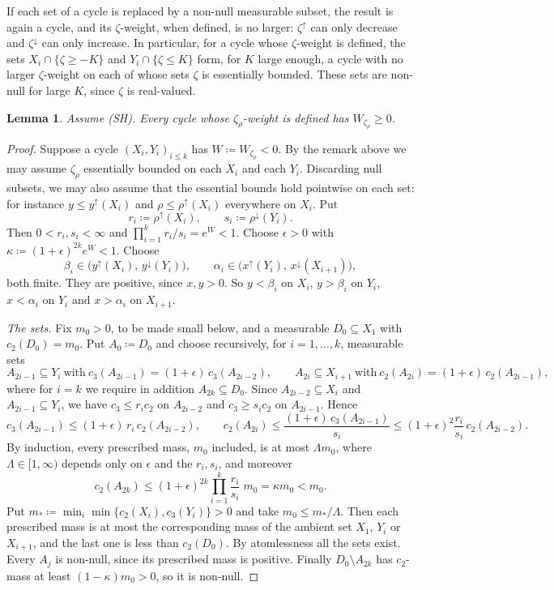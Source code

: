 \documentclass[11pt]{article}
\newtheorem{lemma}[theorem]{Lemma}
\theoremstyle{definition}\newtheorem{definition}[theorem]{Definition}
\theoremstyle{remark}\newtheorem{remark}[theorem]{Remark}
\begin{document}
If each set of a cycle is replaced by a non-null measurable subset, the
result is again a cycle, and its $\zeta$-weight, when defined, is no larger:
$\zeta^{\uparrow}$ can only decrease and $\zeta^{\downarrow}$ can only
increase. In particular, for a cycle whose $\zeta$-weight is defined, the
sets $X_i\cap\{\zeta\ge-K\}$ and $Y_i\cap\{\zeta\le K\}$ form, for $K$ large
enough, a cycle with no larger $\zeta$-weight on each of whose sets $\zeta$
is essentially bounded. These sets are non-null for large $K$, since $\zeta$
is real-valued.

\begin{lemma}\label{lem:sep-debt}
Assume (SH). Every cycle whose $\zeta_\rho$-weight is defined has
$W_{\zeta_\rho}\ge0$.
\end{lemma}

\begin{proof}
Suppose a cycle $(X_i,Y_i)_{i\le k}$ has $W\coloneqq W_{\zeta_\rho}<0$. By the
remark above we may assume $\zeta_\rho$ essentially bounded on each $X_i$
and each $Y_i$. Discarding null subsets, we may also assume that the
essential bounds hold pointwise on each set: for instance
$y\le y^{\uparrow}(X_i)$ and $\rho\le\rho^{\uparrow}(X_i)$ everywhere on
$X_i$. Put
\[
 r_i\coloneqq\rho^{\uparrow}(X_i),\qquad s_i\coloneqq\rho^{\downarrow}(Y_i).
\]
Then $0<r_i,s_i<\infty$ and $\prod_{i=1}^kr_i/s_i=e^{W}<1$. Choose
$\epsilon>0$ with $\kappa\coloneqq(1+\epsilon)^{2k}e^{W}<1$. Choose
\[
 \beta_i\in\bigl(y^{\uparrow}(X_i),\,y^{\downarrow}(Y_i)\bigr),\qquad
 \alpha_i\in\bigl(x^{\uparrow}(Y_i),\,x^{\downarrow}(X_{i+1})\bigr),
\]
both finite. They are positive, since $x,y>0$. So $y<\beta_i$ on $X_i$,
$y>\beta_i$ on $Y_i$, $x<\alpha_i$ on $Y_i$ and $x>\alpha_i$ on $X_{i+1}$.

\emph{The sets.} Fix $m_0>0$, to be made small below, and a measurable
$D_0\subseteq X_1$ with $c_2(D_0)=m_0$. Put $A_0\coloneqq D_0$ and choose
recursively, for $i=1,\dots,k$, measurable sets
\[
 A_{2i-1}\subseteq Y_i\ \text{with}\ c_3(A_{2i-1})=(1+\epsilon)\,c_3(A_{2i-2}),
 \qquad
 A_{2i}\subseteq X_{i+1}\ \text{with}\ c_2(A_{2i})=(1+\epsilon)\,c_2(A_{2i-1}),
\]
where for $i=k$ we require in addition $A_{2k}\subseteq D_0$. Since
$A_{2i-2}\subseteq X_i$ and $A_{2i-1}\subseteq Y_i$, we have
$c_3\le r_ic_2$ on $A_{2i-2}$ and $c_3\ge s_ic_2$ on $A_{2i-1}$. Hence
\[
 c_3(A_{2i-1})\le(1+\epsilon)\,r_i\,c_2(A_{2i-2}),\qquad
 c_2(A_{2i})\le\frac{(1+\epsilon)\,c_3(A_{2i-1})}{s_i}
 \le(1+\epsilon)^2\frac{r_i}{s_i}\,c_2(A_{2i-2}).
\]
By induction, every prescribed mass, $m_0$ included, is at most
$\Lambda m_0$, where $\Lambda\in[1,\infty)$ depends only on $\epsilon$ and
the $r_i,s_i$, and moreover
\[
 c_2(A_{2k})\le(1+\epsilon)^{2k}\prod_{i=1}^k\frac{r_i}{s_i}\;m_0=\kappa m_0<m_0 .
\]
Put $m_*\coloneqq\min_i\min\{c_2(X_i),c_3(Y_i)\}>0$ and take
$m_0\le m_*/\Lambda$. Then each prescribed mass is at most the corresponding
mass of the ambient set $X_1$, $Y_i$ or $X_{i+1}$, and the last one is less
than $c_2(D_0)$. By atomlessness all the sets exist. Every $A_j$ is non-null,
since its prescribed mass is positive. Finally $D_0\setminus A_{2k}$ has
$c_2$-mass at least $(1-\kappa)m_0>0$, so it is non-null.


\end{proof}
\end{document}
